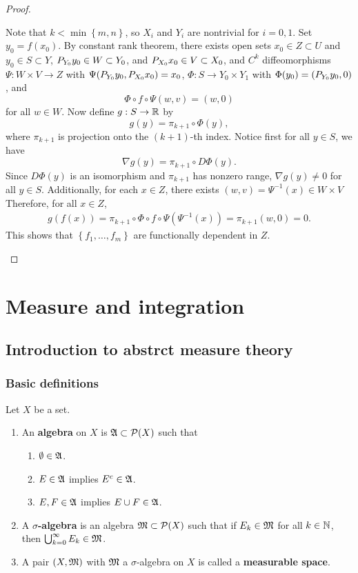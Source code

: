 \documentclass[a4paper]{article}
\begin{document}
\begin{proof}
{\begin{enumerate}
Note that $k < \min \left\{ m, n \right\}$, so $X_i$ and 
$Y_i$ are nontrivial for $i = 0, 1$.
Set $y_0 = f(x_0)$. By constant rank theorem, 
there exists open sets $x_0 \in Z \subset U$ and 
$y_0 \in S \subset Y$, ${P_{Y_0}} y_0 \in W \subset Y_0$, 
and ${P_{X_0}} x_0 \in V \subset X_0$, and $C^k$ diffeomorphisms 
$\Psi: W \times V \to Z$ with $\Psi({P_{Y_0}} y_0, {P_{X_0}} x_0) = x_0$,
$\Phi: S \to Y_0 \times Y_1$ with $\Phi(y_0) = ({P_{Y_0}} y_0, 0)$,
and 
\[
\Phi \circ f \circ \Psi(w, v) = (w, 0)
\]
for all $w \in W$. Now define $g: S \to \mathbb{R}$ 
by 
\[
g(y) = \pi_{k+1} \circ \Phi(y),
\]
where $\pi_{k+1}$ is projection onto the $(k+1)$-th index. 
Notice first for all $y \in S$, we have 
\[
\nabla g(y) = \pi_{k+1} \circ D\Phi(y).
\]
Since $D\Phi(y)$ is an isomorphism and $\pi_{k+1}$ has 
nonzero range, $\nabla g(y) \neq 0$ for all $y \in S$. 
Additionally, for each $x \in Z$, there exists $(w, v)
= \Psi^{-1}(x) \in W \times V$
Therefore, for all $x \in Z$, 
\[
\begin{aligned}
g(f(x)) = \pi_{k+1} \circ \Phi \circ f \circ \Psi(\Psi^{-1}(x)) 
= \pi_{k+1} (w, 0) = 0.
\end{aligned}
\]
This shows that $\left\{ f_1, \dots, f_m \right\}$
are functionally dependent in $Z$.
\end{enumerate}

}
\end{proof}

\section{Measure and integration}

\subsection{Introduction to abstrct measure theory}

\subsubsection{Basic definitions}

\begin{defi}
  Let $X$ be a set.
  \begin{enumerate}
    \item An \textbf{algebra} on $X$ is $\mathfrak{A} \subset
    \mathcal{P}(X)$ such that
    \begin{enumerate}
      \item $\emptyset \in \mathfrak{A}$.
      \item $E \in \mathfrak{A}$ implies $E^c \in \mathfrak{A}$.
      \item $E, F \in \mathfrak{A}$ implies $E \cup F \in \mathfrak{A}$.
    \end{enumerate}

    \item A \textbf{$\sigma$-algebra} is an algebra
    $\mathfrak{M} \subset \mathcal{P}(X)$ such that if
    $E_k \in \mathfrak{M}$ for all $k \in \mathbb{N}$, then
    $\bigcup_{k=0}^\infty E_k \in \mathfrak{M}$.

    \item A pair $(X, \mathfrak{M})$ with $\mathfrak{M}$ a $\sigma$-algebra
    on $X$ is called a \textbf{measurable space}.
  \end{enumerate}
\end{defi}
\end{document}
